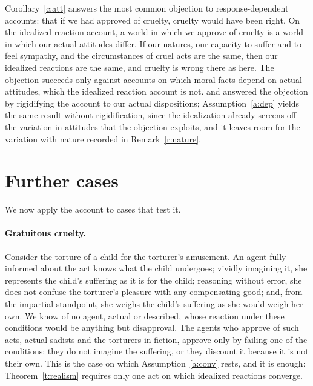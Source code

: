 \documentclass{situationist-preprint}
\begin{document}
Corollary~\ref{c:att} answers the most common objection to response-dependent accounts: that if we had approved of cruelty, cruelty would have been right. On the idealized reaction account, a world in which we approve of cruelty is a world in which our actual attitudes differ. If our natures, our capacity to suffer and to feel sympathy, and the circumstances of cruel acts are the same, then our idealized reactions are the same, and cruelty is wrong there as here. The objection succeeds only against accounts on which moral facts depend on actual attitudes, which the idealized reaction account is not. \citet{Lewis1989} and \citet{Johnston1989} answered the objection by rigidifying the account to our actual dispositions; Assumption~\ref{a:dep} yields the same result without rigidification, since the idealization already screens off the variation in attitudes that the objection exploits, and it leaves room for the variation with nature recorded in Remark~\ref{r:nature}.

\section{Further cases}\label{s:cases}

We now apply the account to cases that test it.

\paragraph{Gratuitous cruelty.} Consider the torture of a child for the torturer's amusement. An agent fully informed about the act knows what the child undergoes; vividly imagining it, she represents the child's suffering as it is for the child; reasoning without error, she does not confuse the torturer's pleasure with any compensating good; and, from the impartial standpoint, she weighs the child's suffering as she would weigh her own. We know of no agent, actual or described, whose reaction under these conditions would be anything but disapproval. The agents who approve of such acts, actual sadists and the torturers in fiction, approve only by failing one of the conditions: they do not imagine the suffering, or they discount it because it is not their own. This is the case on which Assumption~\ref{a:conv} rests, and it is enough: Theorem~\ref{t:realism} requires only one act on which idealized reactions converge.
\end{document}
